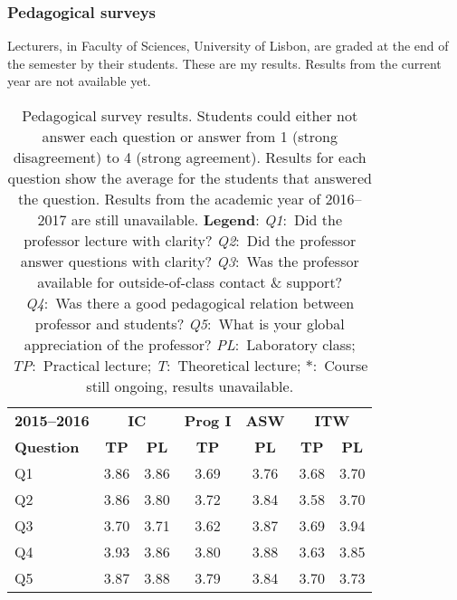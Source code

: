 \subsubsection{Pedagogical surveys}

Lecturers, in Faculty of Sciences, University of Lisbon, are graded at the end of the semester by their students. These are my results. Results from the current year are not available yet.

\begin{table}[H]
\centering
\caption{Pedagogical survey results. Students could either not answer each question or answer from 1 (strong disagreement) to 4 (strong agreement). Results for each question show the average for the students that answered the question. Results from the academic year of 2016--2017 are still unavailable.\hfill\break
\textbf{Legend}:\hfill\break
\textit{Q1}:~Did the professor lecture with clarity?\hfill\break
\textit{Q2}:~Did the professor answer questions with clarity?\hfill\break
\textit{Q3}:~Was the professor available for outside-of-class contact \& support?\hfill\break
\textit{Q4}:~Was there a good pedagogical relation between professor and students?\hfill\break
\textit{Q5}:~What is your global appreciation of the professor?\hfill\break
\textit{PL}:~Laboratory class;\hfill\break
\textit{TP}:~Practical lecture;\hfill\break
\textit{T}:~Theoretical lecture;\hfill\break
\textit{$*$}:~Course still ongoing, results unavailable.}
\label{tab:surveys}
\vspace{5mm}
\begin{tabular}{lcccccc}
\toprule
\bfseries 2015--2016
 & \multicolumn{2}{c}{\bfseries IC}
 & \bfseries Prog I
 & \bfseries ASW
 & \multicolumn{2}{c}{\bfseries ITW} \\
\bfseries Question
 & \bfseries TP
 & \bfseries PL
 & \bfseries TP
 & \bfseries PL
 & \bfseries TP
 & \bfseries PL \\
\midrule
Q1 & 3.86 & 3.86 & 3.69 & 3.76 & 3.68 & 3.70 \\
Q2 & 3.86 & 3.80 & 3.72 & 3.84 & 3.58 & 3.70 \\
Q3 & 3.70 & 3.71 & 3.62 & 3.87 & 3.69 & 3.94 \\
Q4 & 3.93 & 3.86 & 3.80 & 3.88 & 3.63 & 3.85 \\
Q5 & 3.87 & 3.88 & 3.79 & 3.84 & 3.70 & 3.73 \\
\bottomrule
\end{tabular}

\vspace{5mm}


\end{table}
